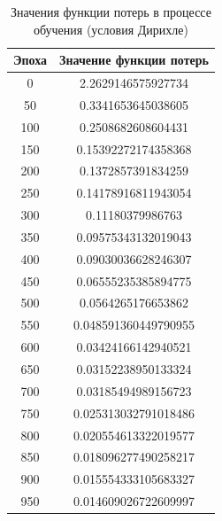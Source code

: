 \documentclass[12pt, a4paper]{article}
\begin{document}
\begin{table}[H]
    \centering
    \caption{Значения функции потерь в процессе обучения (условия Дирихле)}
    \label{tab:loss_history}
    \renewcommand{\arraystretch}{1.2}
    \begin{tabular}{|c|c|}
        \hline
        \textbf{Эпоха} & \textbf{Значение функции потерь} \\ \hline
        0   & 2.2629146575927734 \\ \hline
        50  & 0.3341653645038605 \\ \hline
        100 & 0.2508682608604431 \\ \hline
        150 & 0.15392272174358368 \\ \hline
        200 & 0.1372857391834259 \\ \hline
        250 & 0.14178916811943054 \\ \hline
        300 & 0.11180379986763 \\ \hline
        350 & 0.09575343132019043 \\ \hline
        400 & 0.09030036628246307 \\ \hline
        450 & 0.06555235385894775 \\ \hline
        500 & 0.0564265176653862 \\ \hline
        550 & 0.048591360449790955 \\ \hline
        600 & 0.03424166142940521 \\ \hline
        650 & 0.03152238950133324 \\ \hline
        700 & 0.03185494989156723 \\ \hline
        750 & 0.025313032791018486 \\ \hline
        800 & 0.020554613322019577 \\ \hline
        850 & 0.018096277490258217 \\ \hline
        900 & 0.015554333105683327 \\ \hline
        950 & 0.014609026722609997 \\ \hline
    \end{tabular}
\end{table}

%     
\end{document}
